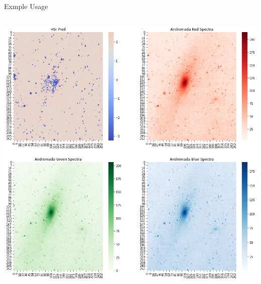\begin{frame}{Exmple Usage}
\begin{columns}
\begin{column}{.67\textwidth}
            \includegraphics[width=\textwidth]{../Images/MicrosoftTeams-image.png}            
        \end{column}
    \end{columns}
\end{frame}